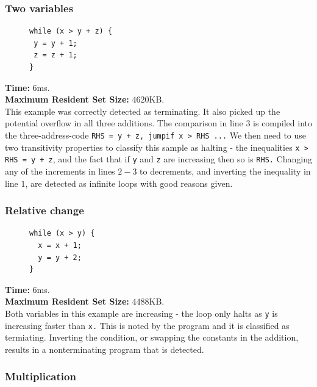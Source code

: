 \documentclass[12pt,a4paper]{article}
\begin{document}
\subsubsection{Two variables \cite[A.6]{tra}}

\begin{figure}
\centering
\begin{lstlisting}[frame=tlrb,language=myLang]
while (x > y + z) {
 y = y + 1;
 z = z + 1;
}
\end{lstlisting}
\end{figure}
\textbf{Time:} 6ms.\\ \textbf{Maximum Resident Set Size:} $4620$KB.\\
This example was correctly detected as terminating. It also picked up the potential overflow in all three additions.
The comparison in line $3$ is compiled into the three-address-code \texttt{RHS = y + z, jumpif x > RHS ...}
We then need to use two transitivity properties to classify this sample as halting - the inequalities \texttt{x > RHS = y + z},
and the fact that if \texttt{y} and \texttt{z} are increasing then so is \texttt{RHS.}
Changing any of the increments in lines $2-3$ to decrements, and inverting the inequality in line $1$, are detected as infinite loops with good reasons given.

\newpage
\subsubsection{Relative change \cite[A.8]{tra}}

\begin{figure}
\centering
\begin{lstlisting}[frame=tlrb,language=myLang]
while (x > y) {
  x = x + 1;
  y = y + 2;
}
\end{lstlisting}
\end{figure}
\textbf{Time:} 6ms.\\ \textbf{Maximum Resident Set Size:} $4488$KB.\\
Both variables in this example are increasing - the loop only halts as \texttt{y} is increasing faster than \texttt{x.} This is noted by the program and it is classified as termiating. Inverting the condition, or swapping the constants in the addition,
results in a nonterminating program that is detected.

\subsubsection{Multiplication \cite[C.1]{tra}} \label{mult}
\end{document}
